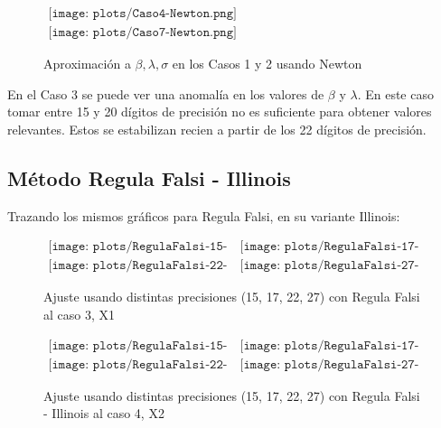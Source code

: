 \begin{figure} [H]
$\begin{array}{c}
\texttt{[image: plots/Caso4-Newton.png]} \\
\texttt{[image: plots/Caso7-Newton.png]}
\end{array}$

\caption{Aproximaci\'on a $\beta, \lambda, \sigma$ en los Casos 1 y 2 
usando Newton}
\end{figure}

En el Caso 3 se puede ver una anomal\'ia en los valores de $\beta$ y $\lambda$. 
En este caso tomar entre 15 y 20 d\'igitos de precisi\'on no es suficiente para 
obtener valores relevantes. Estos se estabilizan recien a partir de los 22 
d\'igitos de precisi\'on.


\subsection{M\'etodo Regula Falsi - Illinois}

Trazando los mismos gr\'aficos para Regula Falsi, en su variante Illinois:

\begin{figure} [H]
$\begin{array}{cc}
\texttt{[image: plots/RegulaFalsi-15-caso3.png]} &
\texttt{[image: plots/RegulaFalsi-17-caso3.png]} \\
\texttt{[image: plots/RegulaFalsi-22-caso3.png]} &
\texttt{[image: plots/RegulaFalsi-27-caso3.png]}
\end{array}$
\caption{Ajuste usando distintas precisiones (15, 17, 22, 27) con 
Regula Falsi al caso 3, X1}
\label{fig:FitCaso3RegulaFalsi}
\end{figure}

\begin{figure} [H]
$\begin{array}{cc}
\texttt{[image: plots/RegulaFalsi-15-caso4.png]} &
\texttt{[image: plots/RegulaFalsi-17-caso4.png]} \\
\texttt{[image: plots/RegulaFalsi-22-caso4.png]} &
\texttt{[image: plots/RegulaFalsi-27-caso4.png]}
\end{array}$
\caption{Ajuste usando distintas precisiones (15, 17, 22, 27) con Regula 
Falsi - Illinois al caso 4, X2}
\label{fig:FitCaso4RegulaFalsi}
\end{figure}


